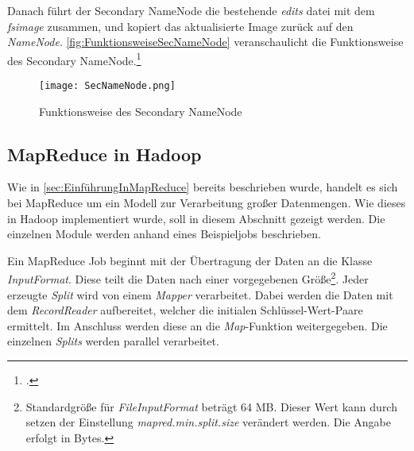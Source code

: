 Danach führt der Secondary NameNode die bestehende \textit{edits} datei mit dem \textit{fsimage} zusammen, und kopiert das aktualisierte Image zurück auf den \textit{NameNode}. \autoref{fig:FunktionsweiseSecNameNode} veranschaulicht die Funktionsweise des Secondary NameNode.\footcite[Vgl.][S. 23]{Lakhe.2014} \\

\begin{figure}[h]
	\texttt{[image: SecNameNode.png]}
	\caption{Funktionsweise des Secondary NameNode\footnotemark}
	\label{fig:FunktionsweiseSecNameNode}
\end{figure}



\subsection{MapReduce in Hadoop}\label{subsec:DatenflussMapReduce}
Wie in \autoref{sec:EinführungInMapReduce} bereits beschrieben wurde, handelt es sich bei MapReduce um ein Modell zur Verarbeitung großer Datenmengen. Wie dieses in Hadoop implementiert wurde, soll in diesem Abschnitt gezeigt werden. Die einzelnen Module werden anhand eines Beispieljobs beschrieben.

Ein MapReduce Job beginnt mit der Übertragung der Daten an die Klasse \textit{InputFormat}. Diese teilt die Daten nach einer vorgegebenen Größe\footnote{Standardgröße für \textit{FileInputFormat} beträgt 64 \ac{MB}. Dieser Wert kann durch setzen der Einstellung \textit{mapred.min.split.size} verändert werden. Die Angabe erfolgt in Bytes.}. Jeder erzeugte \textit{Split} wird von einem \textit{Mapper} verarbeitet. Dabei werden die Daten mit dem \textit{RecordReader} aufbereitet, welcher die initialen Schlüssel-Wert-Paare ermittelt. Im Anschluss werden diese an die \textit{Map}-Funktion weitergegeben. Die einzelnen \textit{Splits} werden parallel verarbeitet.

